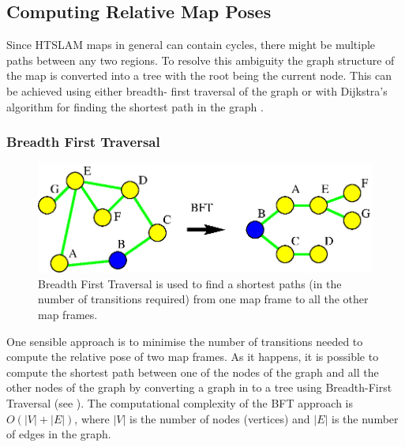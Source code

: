 


\subsection{Computing Relative Map Poses}
\label{sec:relative_poses}

Since HTSLAM maps in general can contain cycles, there might be
multiple paths between any two regions. To resolve this ambiguity the
graph structure of the map is converted into a tree with the root
being the current node. This can be achieved using either breadth-
first traversal of the graph or with Dijkstra's algorithm for finding
the shortest path in the graph \cite{dijkstra_shortest_path}.

\subsubsection{Breadth First Traversal}

\begin{figure}
\begin{center}
\includegraphics[width=12cm]{Pics/fig_bft}
\end{center}
\caption[Breadth First Traversal]
{Breadth First Traversal is used to find a shortest paths (in
the number of transitions required) from one map frame to all the
other map frames.}
\label{fig:bst}
\end{figure}

One sensible approach is to minimise the number of transitions needed
to compute the relative pose of two map frames. As it happens, it
is possible to compute the shortest path between one of the nodes of
the graph and all the other nodes of the graph by converting a graph
in to a tree using Breadth-First Traversal (see ).
The computational complexity of the BFT approach is $O(|V| + |E|)$,
where $|V|$ is the number of nodes (vertices) and $|E|$ is the number of
edges in the graph.


